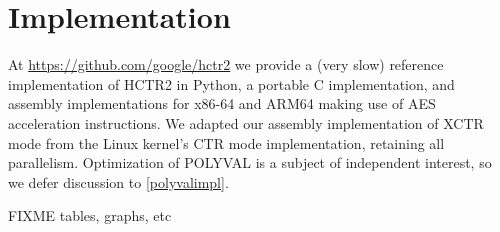 \documentclass[hctr2.tex]{subfiles}
\begin{document}
\section{Implementation}\label{implementation}
At \url{https://github.com/google/hctr2}
we provide a (very slow) reference implementation of HCTR2 in Python,
a portable C implementation, and assembly implementations for
x86-64 and ARM64 making use of AES acceleration instructions.
We adapted our assembly implementation of XCTR mode from
the Linux kernel's CTR mode implementation, retaining all parallelism.
Optimization of POLYVAL is a subject of independent interest,
so we defer discussion to \autoref{polyvalimpl}.

{\color{red} FIXME tables, graphs, etc}
\end{document}

